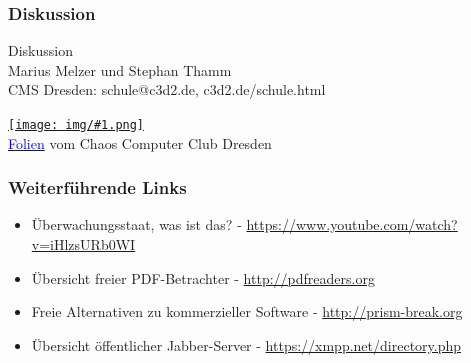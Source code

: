 \documentclass[12pt]{beamer}
\newcommand{\cc}[1]{\texttt{[image: img/\#1.png]}}
\begin{document}
\begin{frame}
    \frametitle{Diskussion}
    \begin{center} {\Large Diskussion}\\Marius Melzer und Stephan Thamm\\CMS Dresden: schule@c3d2.de, c3d2.de/schule.html \end{center}
    \begin{center}
      \href{https://creativecommons.org/licenses/by-sa/4.0/}{\cc{by-sa}} \\
      \href{https://github.com/c3d2/cms/tree/master/2014_03_25_bischofswerda}{\textcolor{blue}{Folien}} vom Chaos Computer Club Dresden
    \end{center}
\end{frame}

\begin{frame}
    \frametitle{Weiterführende Links}
    \begin{itemize}
        \item Überwachungsstaat, was ist das? - \url{https://www.youtube.com/watch?v=iHlzsURb0WI}
        \item Übersicht freier PDF-Betrachter - \url{http://pdfreaders.org}
        \item Freie Alternativen zu kommerzieller Software - \url{http://prism-break.org}
        \item Übersicht öffentlicher Jabber-Server - \url{https://xmpp.net/directory.php}
    \end{itemize}
\end{frame}
\end{document}
